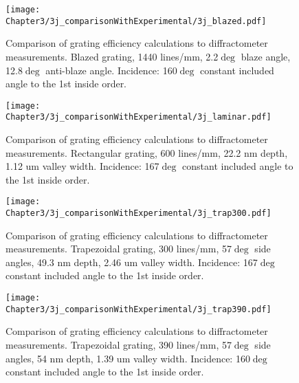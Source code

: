 \begin{figure}[htbp] %
   \centering
   \texttt{[image: Chapter3/3j\_comparisonWithExperimental/3j\_blazed.pdf]} 
   \caption{Comparison of grating efficiency calculations to diffractometer measurements.  Blazed grating, 1440 lines/mm, 2.2$\deg$ blaze angle, 12.8$\deg$ anti-blaze angle. Incidence: 160$\deg$ constant included angle to the 1st inside order.}
   \label{3j-1}
\end{figure}

\begin{figure}[htbp] %
   \centering
   \texttt{[image: Chapter3/3j\_comparisonWithExperimental/3j\_laminar.pdf]} 
   \caption{Comparison of grating efficiency calculations to diffractometer measurements.  Rectangular grating, 600 lines/mm, 22.2 nm depth, 1.12 um valley width.  Incidence: 167$\deg$ constant included angle to the 1st inside order.}
   \label{3j-2}
\end{figure}

\begin{figure}[htbp] %
   \centering
   \texttt{[image: Chapter3/3j\_comparisonWithExperimental/3j\_trap300.pdf]} 
   \caption{Comparison of grating efficiency calculations to diffractometer measurements.  Trapezoidal grating, 300 lines/mm, 57$\deg$ side angles, 49.3 nm depth, 2.46 um valley width.  Incidence: 167$\deg$ constant included angle to the 1st inside order.}
   \label{3j-3}
\end{figure}

\begin{figure}[htbp] %
   \centering
   \texttt{[image: Chapter3/3j\_comparisonWithExperimental/3j\_trap390.pdf]} 
   \caption{Comparison of grating efficiency calculations to diffractometer measurements.  Trapezoidal grating, 390 lines/mm, 57$\deg$ side angles, 54 nm depth, 1.39 um valley width.  Incidence: 160$\deg$ constant included angle to the 1st inside order.}
   \label{3j-4}
\end{figure}
